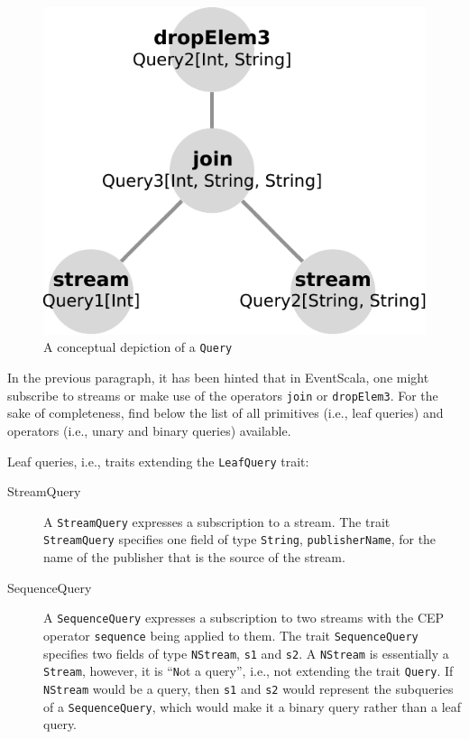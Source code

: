 \documentclass[article, 10pt, type=bsc, colorback, accentcolor=tud8b, parskip=half, bibliography=totocnumbered]{tudthesis}
\begin{document}
\begin{figure}
\caption{A conceptual depiction of a \lstinline{Query}}
\label{fig:query}
\includegraphics[scale=0.7]{images/query.pdf}
\centering
\end{figure}

In the previous paragraph, it has been hinted that in EventScala, one might subscribe to streams or make use of the operators \lstinline{join} or \lstinline{dropElem3}.
For the sake of completeness, find below the list of all primitives (i.e., leaf queries) and operators (i.e., unary and binary queries) available.

Leaf queries, i.e., traits extending the \lstinline{LeafQuery} trait:

\begin{description}
\item[StreamQuery]
A \lstinline{StreamQuery} expresses a subscription to a stream.
The trait \lstinline{StreamQuery} specifies one field of type \lstinline{String}, \lstinline{publisherName}, for the name of the publisher that is the source of the stream.
\item[SequenceQuery]
A \lstinline{SequenceQuery} expresses a subscription to two streams with the CEP operator \lstinline{sequence} being applied to them.
The trait \lstinline{SequenceQuery} specifies two fields of type \lstinline{NStream}, \lstinline{s1} and \lstinline{s2}.
A \lstinline{NStream} is essentially a \lstinline{Stream}, however, it is ``\lstinline{N}ot a query'', i.e., not extending the trait \lstinline{Query}.
If \lstinline{NStream} would be a query, then \lstinline{s1} and \lstinline{s2} would represent the subqueries of a \lstinline{SequenceQuery}, which would make it a binary query rather than a leaf query.
\end{description}
\end{document}
